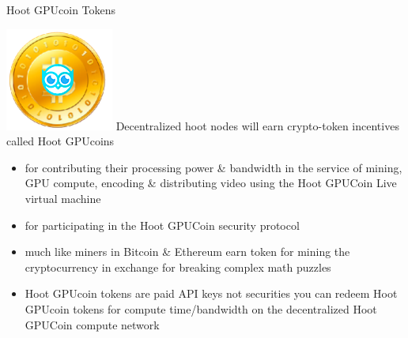 
\begin{frame}[t]{ Hoot GPUcoin Tokens }
 
 
\includegraphics[scale=0.2]{static/hootcoin} Decentralized hoot nodes will earn crypto-token incentives called Hoot GPUcoins 
 

 \begin{itemize}
 \item for contributing their processing power \& bandwidth in the service of mining, GPU compute, encoding \& distributing video using the Hoot GPUCoin Live virtual machine 
 \item for participating in the Hoot GPUCoin security protocol
 \item much like miners in Bitcoin \& Ethereum earn token for mining the cryptocurrency in exchange for breaking complex math puzzles
 \item Hoot GPUcoin tokens are paid API keys not securities you can redeem Hoot GPUcoin tokens for compute time/bandwidth on the decentralized Hoot GPUCoin compute network
 \end{itemize}
 
 
 
\end{frame}